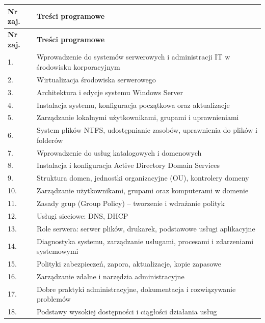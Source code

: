 \documentclass[12pt, a4paper]{article}
\newcommand{\thdrule}{\noalign{\global\setlength{\extrarowheight}{0pt}}}
\newcommand{\thdend}{\noalign{\global\setlength{\extrarowheight}{3pt}}}
\begin{document}
{\scriptsize
\begin{longtable}{m{1.5cm}m{14.5cm}}
\thdrule\toprule
\rowcolor{pjatkRed} {\color{white}\textbf{Nr zaj.}} & {\color{white}\textbf{Treści programowe}} \\
\midrule\thdend
\endfirsthead
\thdrule\toprule
\rowcolor{pjatkRed} {\color{white}\textbf{Nr zaj.}} & {\color{white}\textbf{Treści programowe}} \\
\midrule\thdend
\endhead
  \rowcolor{tableRowLight} 1. & Wprowadzenie do systemów serwerowych i administracji IT w środowisku korporacyjnym \\
  \rowcolor{tableRowAlt} 2. & Wirtualizacja środowiska serwerowego \\
  \rowcolor{tableRowLight} 3. & Architektura i edycje systemu Windows Server \\
  \rowcolor{tableRowAlt} 4. & Instalacja systemu, konfiguracja początkowa oraz aktualizacje \\
  \rowcolor{tableRowLight} 5. & Zarządzanie lokalnymi użytkownikami, grupami i uprawnieniami \\
  \rowcolor{tableRowAlt} 6. & System plików NTFS, udostępnianie zasobów, uprawnienia do plików i folderów \\
  \rowcolor{tableRowLight} 7. & Wprowadzenie do usług katalogowych i domenowych \\
  \rowcolor{tableRowAlt} 8. & Instalacja i konfiguracja Active Directory Domain Services \\
  \rowcolor{tableRowLight} 9. & Struktura domen, jednostki organizacyjne (OU), kontrolery domeny \\
  \rowcolor{tableRowAlt} 10. & Zarządzanie użytkownikami, grupami oraz komputerami w domenie \\
  \rowcolor{tableRowLight} 11. & Zasady grup (Group Policy) – tworzenie i wdrażanie polityk \\
  \rowcolor{tableRowAlt} 12. & Usługi sieciowe: DNS, DHCP \\
  \rowcolor{tableRowLight} 13. & Role serwera: serwer plików, drukarek, podstawowe usługi aplikacyjne \\
  \rowcolor{tableRowAlt} 14. & Diagnostyka systemu, zarządzanie usługami, procesami i zdarzeniami systemowymi \\
  \rowcolor{tableRowLight} 15. & Polityki zabezpieczeń, zapora, aktualizacje, kopie zapasowe \\
  \rowcolor{tableRowAlt} 16. & Zarządzanie zdalne i narzędzia administracyjne \\
  \rowcolor{tableRowLight} 17. & Dobre praktyki administracyjne, dokumentacja i rozwiązywanie problemów \\
  \rowcolor{tableRowAlt} 18. & Podstawy wysokiej dostępności i ciągłości działania usług \\
\bottomrule
\end{longtable}}
\end{document}
